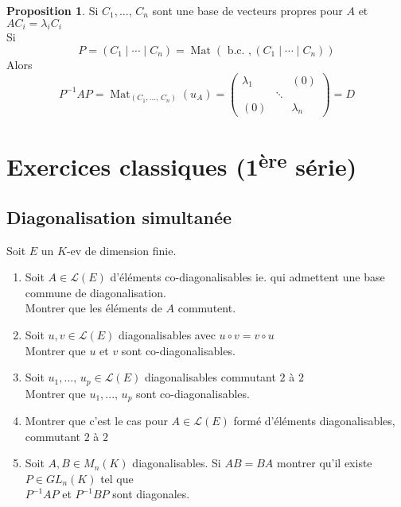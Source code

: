 \documentclass[10pt,a4paper]{article}
\theoremstyle{definition}
\newtheorem{proposition}{Proposition}[section]
\DeclareMathOperator*{\Mat}{Mat}
\begin{document}
\begin{proposition}
Si $C_1, ...,\, C_n$ sont une base de vecteurs propres pour $A$ et $A C_i = \lambda_i C_i$\\
Si 
\[ P = \left(C_1 \mid \cdots \mid C_n \right) = \Mat \left( \text{ b.c. },  (C_1 \mid \cdots \mid C_n) \right) \]
Alors
\[ P^{-1} A P = \Mat_{(C_1, ...,\, C_n)}(u_A) = \begin{pmatrix}
\lambda_1 & & (0) \\
& \ddots & \\
(0) & & \lambda_n
\end{pmatrix} = D \]
\end{proposition}

\pagebreak

\section{Exercices classiques (1\textsuperscript{ère} série)}
\renewcommand{\labelenumi}{\arabic{enumi}.}
\subsection{Diagonalisation simultanée}
\noindent Soit $E$ un $K$-ev de dimension finie.
\begin{enumerate}
\item Soit $A \in \mathcal{L}(E)$ d'éléments co-diagonalisables ie. qui admettent une base commune de diagonalisation. \\
Montrer que les éléments de $A$ commutent.
\item Soit $u, v \in \mathcal{L}(E)$ diagonalisables avec $u \circ v = v \circ u$ \\
Montrer que $u$ et $v$ sont co-diagonalisables.
\item Soit $u_1, ...,\, u_p \in \mathcal{L}(E)$ diagonalisables commutant $2$ à $2$ \\
Montrer que $u_1, ...,\, u_p$ sont co-diagonalisables.
\item Montrer que c'est le cas pour $A \in \mathcal{L}(E)$ formé d'éléments diagonalisables, commutant $2$ à $2$
\item Soit $A, B \in M_n(K)$ diagonalisables. Si $AB = BA$ montrer qu'il existe $P \in GL_n(K)$ tel que \\
$P^{-1}AP$ et $P^{-1}BP$ sont diagonales.
\end{enumerate}
\end{document}

